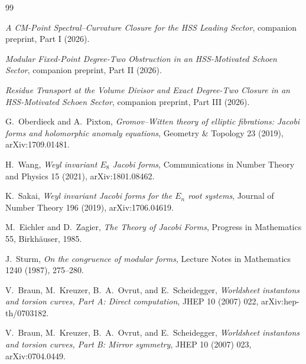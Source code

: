\documentclass[11pt]{article}
\theoremstyle{definition}
\theoremstyle{remark}
\begin{document}
\begin{thebibliography}{99}

\emph{A CM-Point Spectral--Curvature Closure for the HSS Leading Sector}, companion preprint, Part I (2026).

\emph{Modular Fixed-Point Degree-Two Obstruction in an HSS-Motivated Schoen Sector}, companion preprint, Part II (2026).

\emph{Residue Transport at the Volume Divisor and Exact Degree-Two Closure in an HSS-Motivated Schoen Sector}, companion preprint, Part III (2026).

G.~Oberdieck and A.~Pixton,
\emph{Gromov--Witten theory of elliptic fibrations: Jacobi forms and holomorphic anomaly equations},
Geometry \& Topology 23 (2019), arXiv:1709.01481.

H.~Wang,
\emph{Weyl invariant $E_8$ Jacobi forms},
Communications in Number Theory and Physics 15 (2021), arXiv:1801.08462.

K.~Sakai,
\emph{Weyl invariant Jacobi forms for the $E_n$ root systems},
Journal of Number Theory 196 (2019), arXiv:1706.04619.

M.~Eichler and D.~Zagier,
\emph{The Theory of Jacobi Forms},
Progress in Mathematics 55, Birkh\"auser, 1985.

J.~Sturm,
\emph{On the congruence of modular forms},
Lecture Notes in Mathematics 1240 (1987), 275--280.

V.~Braun, M.~Kreuzer, B.~A.~Ovrut, and E.~Scheidegger,
\emph{Worldsheet instantons and torsion curves, Part A: Direct computation},
JHEP 10 (2007) 022, arXiv:hep-th/0703182.

V.~Braun, M.~Kreuzer, B.~A.~Ovrut, and E.~Scheidegger,
\emph{Worldsheet instantons and torsion curves, Part B: Mirror symmetry},
JHEP 10 (2007) 023, arXiv:0704.0449.

\end{thebibliography}
\end{document}
